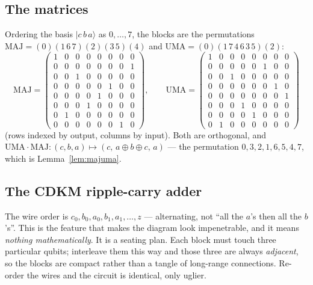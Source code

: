 \documentclass[11pt]{article}
\renewcommand{\ket}[1]{\lvert #1 \rangle}
\newcommand{\MAJ}{\mathrm{MAJ}}
\newcommand{\UMA}{\mathrm{UMA}}
\theoremstyle{plain}
\theoremstyle{remark}
\begin{document}
\subsection{The matrices}
Ordering the basis $\ket{c\,b\,a}$ as $0,\dots,7$, the blocks are the permutations
$\MAJ=(0)(1\,6\,7)(2)(3\,5)(4)$ and $\UMA=(0)(1\,7\,4\,6\,3\,5)(2)$:
\[
\MAJ=\begin{pmatrix}
1&0&0&0&0&0&0&0\\ 0&0&0&0&0&0&0&1\\ 0&0&1&0&0&0&0&0\\ 0&0&0&0&0&1&0&0\\
0&0&0&0&1&0&0&0\\ 0&0&0&1&0&0&0&0\\ 0&1&0&0&0&0&0&0\\ 0&0&0&0&0&0&1&0
\end{pmatrix},
\qquad
\UMA=\begin{pmatrix}
1&0&0&0&0&0&0&0\\ 0&0&0&0&0&1&0&0\\ 0&0&1&0&0&0&0&0\\ 0&0&0&0&0&0&1&0\\
0&0&0&0&0&0&0&1\\ 0&0&0&1&0&0&0&0\\ 0&0&0&0&1&0&0&0\\ 0&1&0&0&0&0&0&0
\end{pmatrix}
\]
(rows indexed by output, columns by input). Both are orthogonal, and
$\UMA\cdot\MAJ:(c,b,a)\mapsto(c,\,a\oplus b\oplus c,\,a)$ --- the permutation $0,3,2,1,6,5,4,7$,
which is Lemma~\ref{lem:majuma}.

\subsection{The CDKM ripple-carry adder}

\begin{keybox}[title={Why the wires look scrambled}]
The wire order is $c_0,b_0,a_0,b_1,a_1,\dots,z$ --- alternating, not ``all the $a$'s then all the
$b$'s''. This is the feature that makes the diagram look impenetrable, and it means \emph{nothing
mathematically}. It is a seating plan. Each block must touch three particular qubits; interleave
them this way and those three are always \emph{adjacent}, so the blocks are compact rather than a
tangle of long-range connections. Re-order the wires and the circuit is identical, only uglier.
\end{keybox}
\end{document}
